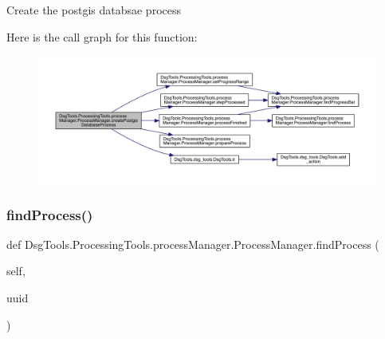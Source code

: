 \begin{DoxyVerb}Create the postgis databsae process
\end{DoxyVerb}
 Here is the call graph for this function\+:
\nopagebreak
\begin{figure}[H]
\begin{center}
\leavevmode
\includegraphics[width=350pt]{class_dsg_tools_1_1_processing_tools_1_1process_manager_1_1_process_manager_a0fb7d4b7632e7b9f848f616f0ca0efbe_cgraph}
\end{center}
\end{figure}
\mbox{\label{class_dsg_tools_1_1_processing_tools_1_1process_manager_1_1_process_manager_a3cb0f2196fab53adc17312b1eadd2386}} 
\subsubsection{\texorpdfstring{find\+Process()}{findProcess()}}
{\footnotesize\ttfamily def Dsg\+Tools.\+Processing\+Tools.\+process\+Manager.\+Process\+Manager.\+find\+Process (\begin{DoxyParamCaption}\item[{}]{self,  }\item[{}]{uuid }\end{DoxyParamCaption})}

